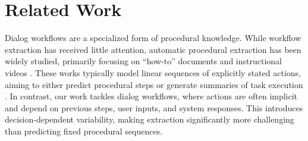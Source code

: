 \section{Related Work}



Dialog workflows are a specialized form of procedural knowledge. While workflow extraction has received little attention, automatic procedural extraction has been widely studied, primarily focusing on ``how-to'' documents \citep{10.1145/2187980.2188194,maeta-etal-2015-framework,Chu2017DistillingTK,Park2018LearningPF} and instructional videos \citep{ushiku-etal-2017-procedural,10.5555/3504035.3504965,xu-etal-2020-benchmark}.
These works typically model linear sequences of explicitly stated actions, aiming to either predict procedural steps or generate summaries of task execution \citep{Koupaee2018WikiHowAL}.
In contrast, our work tackles dialog workflows, where actions are often implicit and depend on previous steps, user inputs, and system responses. This introduces decision-dependent variability, making extraction significantly more challenging than predicting fixed procedural sequences.

